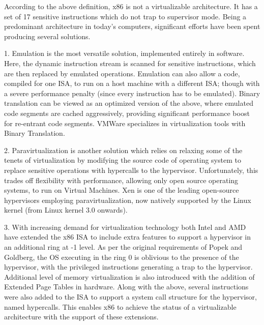 According to the above definition, x86 is not a virtualizable architecture. It has a set of 17 sensitive instructions which do not trap to supervisor mode. Being a predominant architecture in today’s computers, significant efforts have been spent producing several solutions.

1. Emulation is the most versatile solution, implemented entirely in software. Here, the dynamic instruction stream is scanned for sensitive instructions, which are then replaced by emulated operations. Emulation can also allow a code, compiled for one ISA, to run on a host machine with a different ISA; though with a severe performance penalty (since every instruction has to be emulated). Binary translation can be viewed as an optimized version of the above, where emulated code segments are cached aggressively, providing significant performance boost for re-entrant code segments. VMWare specializes in virtualization tools with Binary Translation.

2. Paravirtualization is another solution which relies on relaxing some of the tenets of virtualization by modifying the source code of operating system to replace sensitive operations with hypercalls to the hypervisor. Unfortunately, this trades off flexibility with performance, allowing only open source operating systems, to run on Virtual Machines. Xen is one of the leading open-source hypervisors employing paravirtualization, now natively supported by the Linux kernel (from Linux kernel 3.0 onwards).


3. With increasing demand for virtualization technology both Intel and AMD have extended the x86 ISA to include extra features to support a hypervisor in an additional ring at -1 level. As per the original requirements of Popek and Goldberg, the OS executing in the ring 0 is oblivious to the presence of the hypervisor, with the privileged instructions generating a trap to the hypervisor. Additional level of memory virtualization is also introduced with the addition of Extended Page Tables in hardware. Along with the above, several instructions were also added to the ISA to support a system call structure for the hypervisor, named hypercalls. This enables x86 to achieve the status of a virtualizable architecture with the support of these extensions. 

\setlength{\belowcaptionskip}{-10pt}

